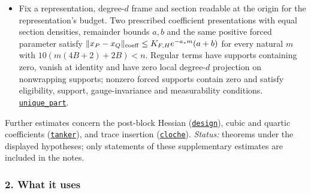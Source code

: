 \documentclass[
  letterpaper,
  11pt]{article}
\begin{document}
\begin{itemize}
  relative to \(H_i\); eventually leaves are masked regular logarithmic
  terms whose threshold-squared expressions have zero first derivative
  at zero and derivatives through order three bounded by \(D_i\) on the
  unit ball; \(\pm z_i\) are healthy; both cutoffs equal one near the
  origin in the two deformation parameters. Here upper rate \(a\) means
  an eventual bound \(e^{rH_i}\) for every \(r>a\). Writing \(P_i\) for
  the paved expansion, for every \(\varepsilon>0\), eventually
  \(\|D_y^2(P_i(z_i;y)+P_i(-z_i;y))|_{y=0}\|\le\eta_{*,i}^{2-\varepsilon}\).
  \href{https://github.com/yang-mills-group/OpenAI-YM-20261028/blob/3456e5e75cf8d4cd558955a5c7638fba2d68f464/YM/RG12/Shadows/Shape.lean\#L54-L70}{\texttt{mirror\_price}}.
\item
  Fix a representation, degree-\(d\) frame and section readable at the
  origin for the representation's budget. Two prescribed coefficient
  presentations with equal section densities, remainder bounds \(a,b\)
  and the same positive forced parameter satisfy
  \(\|x_P-x_Q\|_{\rm coeff}\le K_{F,H}e^{-a_*m}(a+b)\) for every natural
  \(m\) with \(10(m(4B+2)+2B)<n\). Regular terms have supports
  containing zero, vanish at identity and have zero local degree-\(d\)
  projection on nonwrapping supports; nonzero forced supports contain
  zero and satisfy eligibility, support, gauge-invariance and
  measurability conditions.
  \href{https://github.com/yang-mills-group/OpenAI-YM-20261028/blob/3456e5e75cf8d4cd558955a5c7638fba2d68f464/YM/TraceExtension/Quince/Unum.lean\#L11-L42}{\texttt{unique\_part}}.
\end{itemize}

Further estimates concern the post-block Hessian
(\href{https://github.com/yang-mills-group/OpenAI-YM-20261028/blob/3456e5e75cf8d4cd558955a5c7638fba2d68f464/YM/RG12/Spins/Muse.lean\#L35-L59}{\texttt{design}}),
cubic and quartic coefficients
(\href{https://github.com/yang-mills-group/OpenAI-YM-20261028/blob/3456e5e75cf8d4cd558955a5c7638fba2d68f464/YM/FullVolume/Canvas/Reservoir.lean\#L84-L118}{\texttt{tanker}}),
and trace insertion
(\href{https://github.com/yang-mills-group/OpenAI-YM-20261028/blob/3456e5e75cf8d4cd558955a5c7638fba2d68f464/YM/TraceExtension/Zn/Arc.lean\#L16-L33}{\texttt{cloche}}).
\emph{Status:} theorems under the displayed hypotheses; only statements
of these supplementary estimates are included in the notes.

\subsubsection{2. What it uses}\label{what-it-uses-4}
\end{document}
